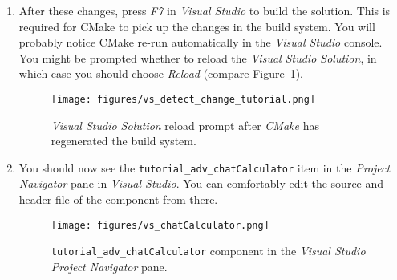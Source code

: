 \begin{enumerate}
\begin{lstlisting}[numbers=left,firstnumber=35,breaklines]
/* XME_COMPONENT_CONFIG_INSTANCE(tutorial_adv_helloWorldComponent, 1); */

XME_COMPONENT_CONFIG_INSTANCE(tutorial_adv_chatComponent, 1);

XME_COMPONENT_CONFIG_INSTANCE(tutorial_adv_chatCalculator) =
{                                                        /~~/ Add this block
	{
		// public
		CHAT_TOPIC_BASE // topic
	}
};

/*************************************************************************/
/***   Component descriptor                                            ***/
/*************************************************************************/
XME_COMPONENT_LIST_BEGIN
	XME_COMPONENT_LIST_ITEM(xme_core_nodeManager, 0)
	XME_COMPONENT_LIST_ITEM(xme_prim_ipLoginServerProxy, 0)
	XME_COMPONENT_LIST_ITEM(xme_prim_neighborhoodDiscovery, 0)
/*	XME_COMPONENT_LIST_ITEM(tutorial_adv_helloWorldComponent, 0) */
	XME_COMPONENT_LIST_ITEM(tutorial_adv_chatComponent, 0)
	XME_COMPONENT_LIST_ITEM(tutorial_adv_chatCalculator, 0)                                               /~~/ Add the line above
XME_COMPONENT_LIST_END;
\end{lstlisting}

	\item After these changes, press \emph{F7} in \emph{Visual Studio} to build the solution.
		This is required for CMake to pick up the changes in the build system.
		You will probably notice CMake re-run automatically in the \emph{Visual Studio} console.
		You might be prompted whether to reload the \emph{Visual Studio Solution}, in which case you should choose \emph{Reload}
		(compare Figure~\ref{fig:vs_detect_change_tutorial}).

\begin{figure}[htpb]
	\centering
	\texttt{[image: figures/vs\_detect\_change\_tutorial.png]}
	\caption{\emph{Visual Studio Solution} reload prompt after \emph{CMake} has regenerated the build system.}
	\label{fig:vs_detect_change_tutorial}
\end{figure}

	\item You should now see the \verb|tutorial_adv_chatCalculator| item in the \emph{Project Navigator} pane in \emph{Visual Studio}.
		You can comfortably edit the source and header file of the component from there.

\begin{figure}[htpb]
	\centering
	\texttt{[image: figures/vs\_chatCalculator.png]}
	\caption{\texttt{tutorial\_adv\_chatCalculator} component in the \emph{Visual Studio Project Navigator} pane.}
	\label{fig:vs_chatCalculator}
\end{figure}


\end{enumerate}
